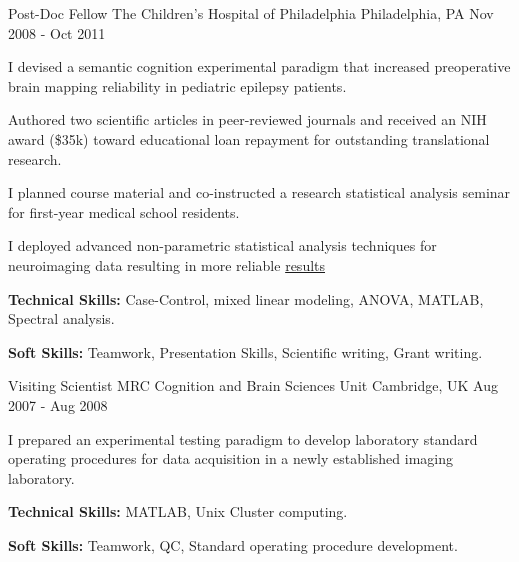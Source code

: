 \begin{cventries}
  \cventry
  {Post-Doc Fellow} %
  {The Children's Hospital of Philadelphia} %
  {Philadelphia, PA} %
  {Nov 2008 - Oct 2011} %
  {
    \begin{cvitems} %
      \item {I devised a semantic cognition experimental paradigm that increased preoperative brain mapping reliability in pediatric epilepsy patients.}
      \item {Authored two scientific articles in peer-reviewed journals and received an NIH award (\$35k) toward educational loan repayment for outstanding translational research.} 
      \item {I planned course material and co-instructed a research statistical analysis seminar for first-year medical school residents.}
      \item {I deployed advanced non-parametric statistical analysis techniques for neuroimaging data resulting in more reliable \href{https://doi.org/10.1016/j.biopsych.2011.01.015}{results}}
      \item {\textbf{Technical Skills:} Case-Control, mixed linear modeling, ANOVA, MATLAB, Spectral analysis.}
      \item {\textbf{Soft Skills:} Teamwork, Presentation Skills, Scientific writing, Grant writing.}
    \end{cvitems}
  }

  \cventry
  {Visiting Scientist} %
  {MRC Cognition and Brain Sciences Unit} %
  {Cambridge, UK} %
  {Aug 2007 - Aug 2008} %
  {
    \begin{cvitems} %
      \item {I prepared an experimental testing paradigm to develop laboratory standard operating procedures for data acquisition in a newly established imaging laboratory.}
      \item {\textbf{Technical Skills:} MATLAB, Unix Cluster computing.}
      \item {\textbf{Soft Skills:} Teamwork, QC, Standard operating procedure development.}
    \end{cvitems}
  }

\end{cventries}

